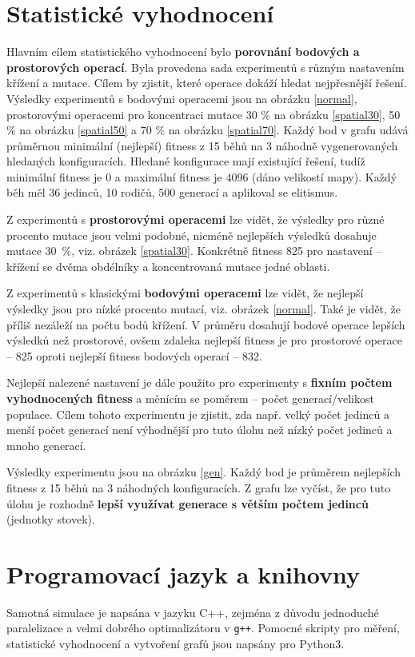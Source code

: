 \documentclass[12pt]{article}
\begin{document}
\section{Statistické vyhodnocení}
\label{stat}

Hlavním cílem statistického vyhodnocení bylo \textbf{porovnání bodových a prostorových operací}. Byla provedena sada experimentů s různým nastavením křížení a mutace. Cílem by zjistit, které operace dokáží hledat nejpřesnější řešení. Výsledky experimentů s bodovými operacemi jsou na obrázku \ref{normal}, prostorovými operacemi pro koncentraci mutace 30 \% na obrázku \ref{spatial30}, 50 \% na obrázku \ref{spatial50} a 70 \% na obrázku \ref{spatial70}. Každý bod v grafu udává průměrnou minimální (nejlepší) fitness z 15 běhů na 3 náhodně vygenerovaných hledaných konfiguracích. Hledané konfigurace mají existující řešení, tudíž minimální fitness je 0 a maximální fitness je 4096 (dáno velikostí mapy). Každý běh měl 36 jedinců, 10 rodičů, 500 generací a aplikoval se elitismus.

Z experimentů s \textbf{prostorovými operacemi} lze vidět, že výsledky pro různé procento mutace jsou velmi podobné, nicméně nejlepších výsledků dosahuje mutace 30~\%, viz. obrázek \ref{spatial30}. Konkrétně fitness 825 pro nastavení -- křížení se dvěma obdélníky a koncentrovaná mutace jedné oblasti.

Z experimentů s klasickými \textbf{bodovými operacemi} lze vidět, že nejlepší výsledky jsou pro nízké procento mutací, viz. obrázek \ref{normal}. Také je vidět, že příliš nezáleží na počtu bodů křížení. V průměru dosahují bodové operace lepších výsledků než prostorové, ovšem zdaleka nejlepší fitness je pro prostorové operace -- 825 oproti nejlepší fitness bodových operací -- 832. 

Nejlepší nalezené nastavení je dále použito pro experimenty s \textbf{fixním počtem vyhodnocených fitness} a měnícím se poměrem -- počet generací/velikost populace. Cílem tohoto experimentu je zjistit, zda např. velký počet jedinců a menší počet generací není výhodnější pro tuto úlohu než nízký počet jedinců a mnoho generací.

Výsledky experimentu jsou na obrázku \ref{gen}. Každý bod je průměrem nejlepších fitness z 15 běhů na 3 náhodných konfiguracích. Z grafu lze vyčíst, že pro tuto úlohu je rozhodně \textbf{lepší využívat generace s větším počtem jedinců} (jednotky stovek).

\section{Programovací jazyk a knihovny}
Samotná simulace je napsána v jazyku C++, zejména z důvodu jednoduché paralelizace a velmi dobrého optimalizátoru v \texttt{g++}. Pomocné skripty pro měření, statistické vyhodnocení a vytvoření grafů jsou napsány pro Python3.
\end{document}
